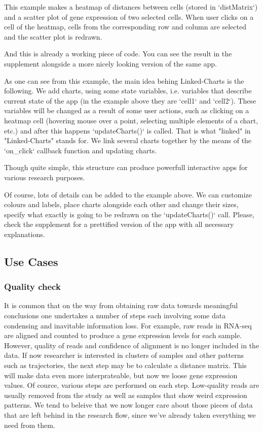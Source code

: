 \documentclass[twocolumn,10pt]{article}
\begin{document}
This example makes a heatmap of distances between cells (stored in `distMatrix`) and a scatter plot of gene expression of two selected cells. When user clicks on a cell of the heatmap, cells from the corresponding row and column are selected and the scatter plot is redrawn.

And this is already a working piece of code. You can see the result in the supplement alongside a more nicely looking version of the same app.

As one can see from this example, the main idea behing Linked-Charts is the following. We add charts, using some state variables, i.e. variables that describe current state of the app (in the example above they are `cell1` and `cell2`). These variables will be changed as a result of some user actions, such as clicking on a heatmap cell (hovering mouse over a point, selecting multiple elements of a chart, etc.) and after this happens `updateCharts()` is called. That is what "linked" in "Linked-Charts" stands for. We link several charts together by the means of the `on_click` callback function and updating charts.

Though quite simple, this structure can produce powerfull interactive apps for various research purposes.

Of course, lots of details can be added to the example above. We can customize colours and labels, place charts alongside each other and change their sizes, specify what exactly is going to be redrawn on the `updateCharts()` call. Please, check the supplement for a prettified version of the app with all necessary explanations.

\subsection{Use Cases}
\subsubsection{Quality check}
It is common that on the way from obtaining raw data towards meaningful conclusions one undertakes a number of steps each involving some data condensing and inavitable information loss. For example, raw reads in RNA-seq are aligned and counted to produce a gene expression levels for each sample. However, quality of reads and confidence of alignment is no longer included in the data. If now researcher is interested in clusters of samples and other patterns such as trajectories, the next step may be to calculate a distance matrix. This will make data even more interprateable, but now we loose gene expression values. Of cource, various steps are performed on each step. Low-quality reads are usually removed from the study as well as samples that show weird expression patterns. We tend to beleive that we now longer care about those pieces of data that are left behind in the research flow, since we've already taken everything we need from them.
\end{document}
